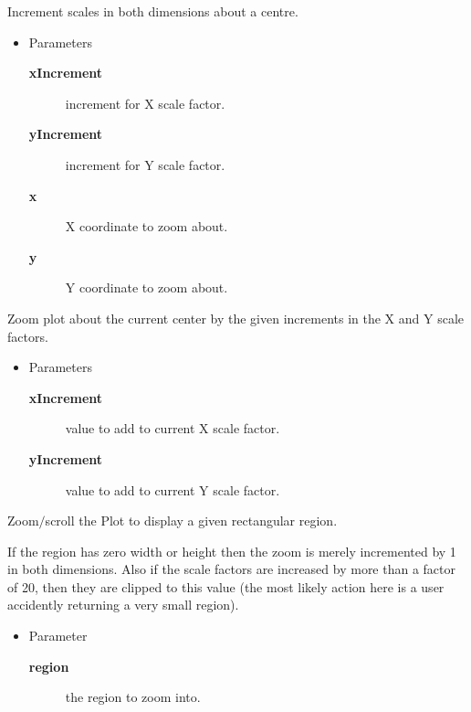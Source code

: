 \begin{desc}Increment scales in both dimensions about a centre.
\begin{itemize}
\item{Parameters
  \begin{description}
   \item[\textbf{xIncrement}]{increment for X scale factor.}
   \item[\textbf{yIncrement}]{increment for Y scale factor.}
   \item[\textbf{x}]{X coordinate to zoom about.}
   \item[\textbf{y}]{Y coordinate to zoom about.}
  \end{description}}
\end{itemize}
\end{desc}

\begin{desc}Zoom plot about the current center by the given increments in
 the X and Y scale factors.
\begin{itemize}
\item{Parameters
  \begin{description}
   \item[\textbf{xIncrement}]{value to add to current X scale factor.}
   \item[\textbf{yIncrement}]{value to add to current Y scale factor.}
  \end{description}}
\end{itemize}
\end{desc}

\begin{desc}Zoom$/$scroll the Plot to display a given rectangular region.
 
 If the region has zero width or height then the zoom is merely
 incremented by 1 in both dimensions. Also if the scale factors
 are increased by more than a factor of 20, then they are
 clipped to this value (the most likely action here is a user
 accidently returning a very small region).
\begin{itemize}
\item{Parameter
  \begin{description}
   \item[\textbf{region}]{the region to zoom into.}
  \end{description}}
\end{itemize}
\end{desc}

